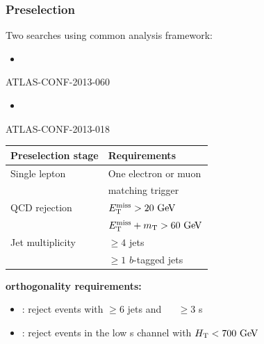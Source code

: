\begin{frame}\frametitle{Preselection}
\centering\myskip

\begin{minipage}{.6\textwidth}\centering\footnotesize
Two searches using common analysis framework:
\begin{minipage}{.5\textwidth}\centering
\begin{itemize}
\item \wbx
\end{itemize}
\scriptsize
\cccolor 

ATLAS-CONF-2013-060~\cite{ATLAS-CONF-2013-060}
\end{minipage}\begin{minipage}{.5\textwidth}\centering
\begin{itemize}
\item \htx
\end{itemize}
\scriptsize
\cccolor 

ATLAS-CONF-2013-018~\cite{ATLAS-CONF-2013-018}
\end{minipage}

\myskip

\begin{tabular}{ll}
\toprule
Preselection stage & Requirements \\
\midrule
Single lepton & One electron or muon\\
              & matching trigger  \\\midrule
QCD rejection & $\met >20\gev$\\
              & $\met +m_{\rm T}>60\gev$ \\\midrule
Jet multiplicity & $\geq 4$ jets\\
                 & $\geq 1$ $b$-tagged jets \\
\bottomrule\end{tabular}

\myskip
{\bfseries\cccolor orthogonality requirements:} 

\begin{itemize}
\item \wbx: reject events with $\geq$6 jets and $\quad$ $\geq$3 \bjet s
\item \htx: reject events in the low \btag s channel with $\HT<700\gev$
\end{itemize}

\myskip


\end{minipage}
\end{frame}

